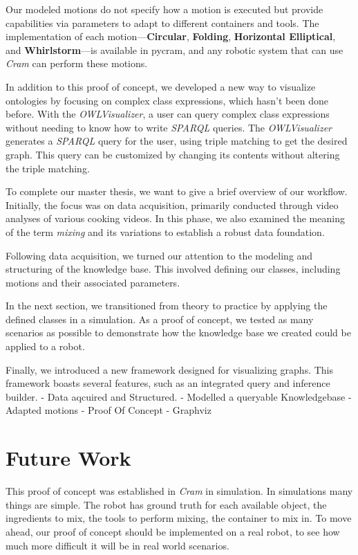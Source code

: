 Our modeled motions do not specify how a motion is executed but provide capabilities via parameters to adapt to different containers and tools. The implementation of each motion—\textbf{Circular}, \textbf{Folding}, \textbf{Horizontal Elliptical}, and \textbf{Whirlstorm}—is available in pycram, and any robotic system that can use \textit{Cram} can perform these motions.

In addition to this proof of concept, we developed a new way to visualize ontologies by focusing on complex class expressions, which hasn't been done before. With the \textit{OWLVisualizer}, a user can query complex class expressions without needing to know how to write \textit{SPARQL} queries. The \textit{OWLVisualizer} generates a \textit{SPARQL} query for the user, using triple matching to get the desired graph. This query can be customized by changing its contents without altering the triple matching.


To complete our master thesis, we want to give a brief overview of our workflow.
Initially, the focus was on data acquisition, primarily conducted through video analyses of various cooking videos. In this phase, we also examined the meaning of the term \textit{mixing} and its variations to establish a robust data foundation.

Following data acquisition, we turned our attention to the modeling and structuring of the knowledge base. This involved defining our classes, including motions and their associated parameters.

In the next section, we transitioned from theory to practice by applying the defined classes in a simulation. As a proof of concept, we tested as many scenarios as possible to demonstrate how the knowledge base we created could be applied to a robot.

Finally, we introduced a new framework designed for visualizing graphs. This framework boasts several features, such as an integrated query and inference builder.
- Data aqcuired and Structured.
- Modelled a queryable Knowledgebase
- Adapted motions
- Proof Of Concept
- Graphviz
\section{Future Work}
This proof of concept was established in \textit{Cram} in simulation. In simulations many things are simple.
The robot has ground truth for each available object, the ingredients to mix, the tools to perform mixing, the container to mix in. 
To move ahead, our proof of concept should be implemented on a real robot, to see how much more difficult it will 
be in real world scenarios.

